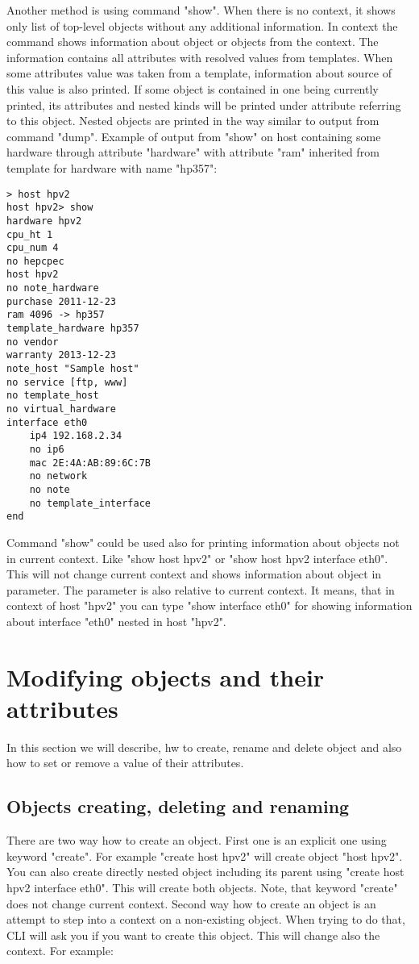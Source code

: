 \documentclass[deska]{subfiles}
\begin{document}
Another method is using command "show". When there is no context, it shows only list of top-level objects without any
additional information. In context the command shows information about object or objects from the context. The
information contains all attributes with resolved values from templates. When some attributes value was taken from
a template, information about source of this value is also printed. If some object is contained in one being currently
printed, its attributes and nested kinds will be printed under attribute referring to this object. Nested objects are
printed in the way similar to output from command "dump". Example of output from "show" on host containing some hardware
through attribute "hardware" with attribute "ram" inherited from template for hardware with name "hp357":

\begin{verbatim}
> host hpv2
host hpv2> show
hardware hpv2
cpu_ht 1
cpu_num 4
no hepcpec
host hpv2
no note_hardware
purchase 2011-12-23
ram 4096 -> hp357
template_hardware hp357
no vendor
warranty 2013-12-23
note_host "Sample host"
no service [ftp, www]
no template_host
no virtual_hardware
interface eth0
    ip4 192.168.2.34
    no ip6
    mac 2E:4A:AB:89:6C:7B
    no network
    no note
    no template_interface
end
\end{verbatim}

Command "show" could be used also for printing information about objects not in current context. Like "show host hpv2" or
"show host hpv2 interface eth0". This will not change current context and shows information about object in parameter.
The parameter is also relative to current context. It means, that in context of host "hpv2" you can type "show interface eth0"
for showing information about interface "eth0" nested in host "hpv2".

\section{Modifying objects and their attributes}

In this section we will describe, hw to create, rename and delete object and also how to set or remove a value of their
attributes.

\subsection{Objects creating, deleting and renaming}

There are two way how to create an object. First one is an explicit one using keyword "create". For example "create
host hpv2" will create object "host hpv2". You can also create directly nested object including its parent using
"create host hpv2 interface eth0". This will create both objects. Note, that keyword "create" does not change
current context. Second way how to create an object is an attempt to step into a context on a non-existing object.
When trying to do that, CLI will ask you if you want to create this object. This will change also the context.
For example:
\end{document}
